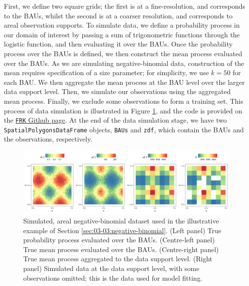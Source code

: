 \documentclass[12pt,a4paper]{article}
\begin{document}
First, we define two square grids; the first is at a fine-resolution, and corresponds to the BAUs, whilst the second is at a coarser resolution, and corresponds to areal observation supports. 
To simulate data, we define a probability process in our domain of interest by passing a sum of trigonometric functions through the logistic function, and then evaluating it over the BAUs. 
Once the probability process over the BAUs is defined, we then construct the mean process evaluated over the BAUs. 
 As we are simulating negative-binomial data, construction of the mean requires specification of a size parameter; for simplicity, we use $k = 50$ for each BAU.
We then aggregate the mean process at the BAU level over the larger data support level.
Then, we simulate our observations using the aggregated mean process. 
Finally, we exclude some observations to form a training set.
This process of data simulation is illustrated in Figure \ref{fig:03-02-negative-binomial_data}, and the code is provided on the \href{https://github.com/andrewzm/FRK}{\texttt{FRK} Github page}. 
At the end of the data simulation stage, we have two \texttt{SpatialPolygonsDataFrame} objects, \texttt{BAUs} and \texttt{zdf}, which contain the BAUs and the observations, respectively. 


\begin{figure}[t!]
    \centering
    \includegraphics[width = \linewidth]{Images/03-02-negative_binomial_spatialCOS_data.png}
    \caption{Simulated, areal negative-binomial dataset used in the illustrative example of Section \ref{sec:03-03:negative-binomial}. 
    (Left panel) True probability process evaluated over the BAUs. 
    (Centre-left panel) True mean process evaluated over the BAUs. 
    (Centre-right panel) True mean process aggregated to the data support level. 
    (Right panel) Simulated data at the data support level, with some observations omitted; this is the data used for model fitting.  
}   
  \label{fig:03-02-negative-binomial_data}
\end{figure}
\end{document}
